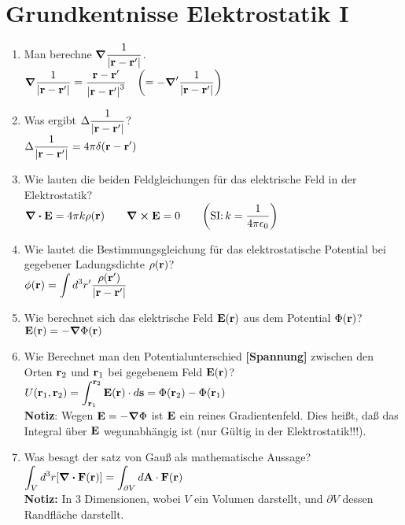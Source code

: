 \documentclass{scrartcl}
\newcommand{\rr}[1]{\frac{#1}{\abs{\vb{r}-\vb{r}'}}}
\newcommand{\ds}{\displaystyle}
\begin{document}
\section{Grundkentnisse Elektrostatik I}
  \begin{enumerate}
    \item Man berechne $\ds \grad\rr{1}$.\\
          $\ds \grad\rr{1}=
           \frac{\vb r -\vb r'}{\abs{\vb r - \vb r'}^3}\quad
           \qty(=-\grad'\rr{1})$

    \item Was ergibt $\ds \Delta\rr{1}$?\\
          $\ds \Delta \rr{1} = 4\pi \delta(\vb r-\vb r')$
      
    \item Wie lauten die beiden Feldgleichungen für das 
          elektrische Feld in der Elektrostatik?\\
          $\ds \div \vb E=4\pi k\rho(\vb r)\qquad\curl\vb E=0
           \qquad\qty(\text{SI:}\,k=\frac{1}{4\pi\epsilon_0})$
    
    \item Wie lautet die Bestimmungsgleichung für das elektrostatische 
          Potential bei gegebener Ladungsdichte $\rho(\vb r)$?\\
          $\ds \phi(\vb r)=\int d^3r'\rr{\rho(\vb r')}$ 

    \item Wie berechnet sich das elektrische Feld $\vb E (\vb r)$ aus dem
          Potential $\Phi(\vb r)$?\\
          $\ds \vb E(\vb r) = - \grad \Phi (\vb r)$

    \item Wie Berechnet man den Potentialunterschied \textbf{[Spannung]}
          zwischen den Orten 
          $\vb r_2$ und $\vb r_1$ bei gegebenem Feld $\vb E(\vb r)$?\\
          $\ds U(\vb r_1, \vb r_2)=\int_{\vb r_1}^{\vb r_2}
           \vb E(\vb r)\cdot d\vb s
           =\Phi(\vb r_2)-\Phi(\vb r_1)$\\
           \textbf{Notiz}: Wegen $\vb E=-\grad\Phi$ ist $\vb E$ ein reines
           Gradientenfeld. Dies heißt, daß das Integral über $\vb E$
           wegunabhängig ist (nur Gültig in der Elektrostatik!!!).

    \item Was besagt der satz von Gauß als mathematische Aussage?\\
          $\ds \int_V d^3r \qty[\div \vb F(\vb r)]=
           \int_{\partial V}d\vb A\cdot \vb F(\vb r)$\\
          \textbf{Notiz:} In 3 Dimensionen, wobei $V$ ein Volumen darstellt,
          und $\partial V$ dessen Randfläche darstellt.


\end{enumerate}
\end{document}
